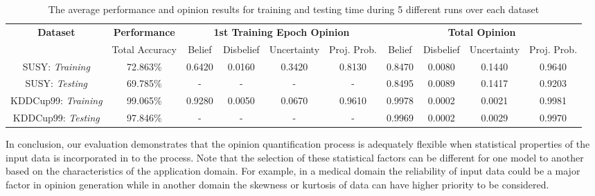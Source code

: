 \begin{table}[!ht]
\centering
\begin{tabular}{c c cccc cccc}
    \toprule
\multirow{2}{*}{\textbf{Dataset}} 
        & \multicolumn{1}{c}{\textbf{Performance}} & \multicolumn{4}{c}{\textbf{1st Training Epoch Opinion}} &
        \multicolumn{4}{c}{\textbf{Total Opinion}} \\
    \cmidrule(lr){2-2} \cmidrule(lr){3-6} \cmidrule(lr){7-10}
        & Total Accuracy & Belief & Disbelief & Uncertainty & Proj. Prob. & Belief  & Disbelief & Uncertainty & Proj. Prob. \\
    \midrule
SUSY: \textit{Training} 
        & 72.863\%  & 0.6420 & 0.0160 & 0.3420 & 0.8130 & 0.8470 & 0.0080 & 0.1440 & 0.9640      \\
    \addlinespace
SUSY: \textit{Testing}
        & 69.785\%   & - & - & - & - &  0.8495 & 0.0089 & 0.1417 & 0.9203        \\
    \addlinespace
KDDCup99: \textit{Training}
        & 99.065\%  & 0.9280 & 0.0050 & 0.0670 & 0.9610 & 0.9978 & 0.0002 & 0.0021 & 0.9981 \\
    \addlinespace
KDDCup99: \textit{Testing}
        & 97.846\%   &  -   &  -  &  -  & - &  0.9969 & 0.0002 & 0.0029 & 0.9970    \\

    \bottomrule
\end{tabular}
\vspace{2mm}
\caption{The average performance and opinion results for training and testing time during 5 different runs over each dataset}
\label{result}
\end{table}
In conclusion, our evaluation demonstrates that the opinion quantification process is adequately flexible when statistical properties of the input data is incorporated in to the process. Note that the selection of these statistical factors can be different for one model to another based on the characteristics of the application domain. For example, in a medical domain the reliability of input data could be a major factor in opinion generation while in another domain the skewness or kurtosis of data can have higher priority to be considered.

